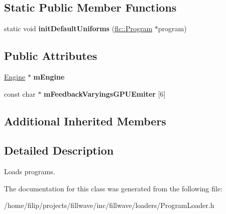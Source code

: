 \subsection*{Static Public Member Functions}
\begin{DoxyCompactItemize}
\item 
\mbox{\label{classflw_1_1flf_1_1ProgramLoader_ae5e0e6fec3dd58815642980692b0e2ce}} 
static void {\bfseries init\+Default\+Uniforms} (\hyperlink{classflw_1_1flc_1_1Program}{flc\+::\+Program} $\ast$program)
\end{DoxyCompactItemize}
\subsection*{Public Attributes}
\begin{DoxyCompactItemize}
\item 
\mbox{\label{classflw_1_1flf_1_1ProgramLoader_ae568c08c79a5ef1d609cb765b83ec81f}} 
\hyperlink{classflw_1_1Engine}{Engine} $\ast$ {\bfseries m\+Engine}
\item 
\mbox{\label{classflw_1_1flf_1_1ProgramLoader_a8b814c9e521e08e45d792a095362768c}} 
const char $\ast$ {\bfseries m\+Feedback\+Varyings\+G\+P\+U\+Emiter} \mbox{[}6\mbox{]}
\end{DoxyCompactItemize}
\subsection*{Additional Inherited Members}


\subsection{Detailed Description}
Loads programs. 

The documentation for this class was generated from the following file\+:\begin{DoxyCompactItemize}
\item 
/home/filip/projects/fillwave/inc/fillwave/loaders/Program\+Loader.\+h\end{DoxyCompactItemize}
